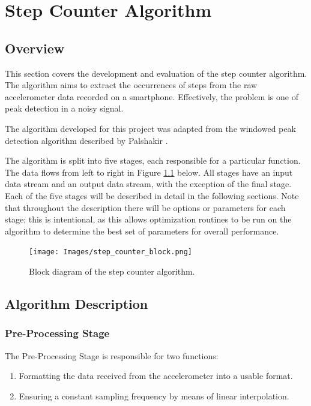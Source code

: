 \part{Step Counter Algorithm}

    \chapter{Overview}

        This section covers the development and evaluation of the step counter algorithm. The algorithm aims to extract the occurrences of steps from the raw accelerometer data recorded on a smartphone. Effectively, the problem is one of peak detection in a noisy signal.

        The algorithm developed for this project was adapted from the windowed peak detection algorithm described by Palshakir \cite{palshikar}.

        The algorithm is split into five stages, each responsible for a particular function. The data flows from left to right in Figure \ref{img_sc_block} below. All stages have an input data stream and an output data stream, with the exception of the final stage. Each of the five stages will be described in detail in the following sections. Note that throughout the description there will be options or parameters for each stage; this is intentional, as this allows optimization routines to be run on the algorithm to determine the best set of parameters for overall performance. 

        \begin{figure}[h]
            \texttt{[image: Images/step\_counter\_block.png]}
            \centering
            \caption{Block diagram of the step counter algorithm.}
            \label{img_sc_block}
        \end{figure}

    \chapter{Algorithm Description}

        \section{Pre-Processing Stage}

            The Pre-Processing Stage is responsible for two functions:

            \begin{enumerate}
                \item Formatting the data received from the accelerometer into a usable format.
                \item Ensuring a constant sampling frequency by means of linear interpolation.
            \end{enumerate}

